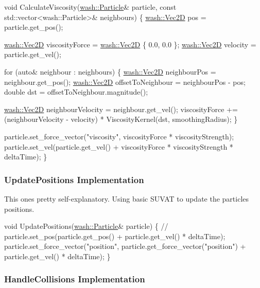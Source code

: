 \begin{DoxyCode}
\textcolor{keywordtype}{void} CalculateViscosity(\mbox{\hyperlink{classwash_1_1Particle}{wash::Particle}}& particle, \textcolor{keyword}{const} std::vector<wash::Particle>& 
      neighbours) \{
    \mbox{\hyperlink{classwash_1_1Vec}{wash::Vec2D}} pos = particle.get\_pos();

    \mbox{\hyperlink{classwash_1_1Vec}{wash::Vec2D}} viscosityForce = \mbox{\hyperlink{classwash_1_1Vec}{wash::Vec2D}} \{ 0.0, 0.0 \};
    \mbox{\hyperlink{classwash_1_1Vec}{wash::Vec2D}} velocity = particle.get\_vel();

    \textcolor{keywordflow}{for} (\textcolor{keyword}{auto}& neighbour : neighbours) \{
        \mbox{\hyperlink{classwash_1_1Vec}{wash::Vec2D}} neighbourPos = neighbour.get\_pos();
        \mbox{\hyperlink{classwash_1_1Vec}{wash::Vec2D}} offsetToNeighbour = neighbourPos - pos;
        \textcolor{keywordtype}{double} dst = offsetToNeighbour.magnitude();

        \mbox{\hyperlink{classwash_1_1Vec}{wash::Vec2D}} neighbourVelocity = neighbour.get\_vel();
        viscosityForce += (neighbourVelocity - velocity) * ViscosityKernel(dst, smoothingRadius);
    \}

    particle.set\_force\_vector(\textcolor{stringliteral}{"viscosity"}, viscosityForce * viscosityStrength);
    particle.set\_vel(particle.get\_vel() + viscosityForce * viscosityStrength * deltaTime);
\}
\end{DoxyCode}


\subsubsection*{Update\+Positions Implementation}

This one\textquotesingle{}s pretty self-\/explanatory. Using basic S\+U\+V\+AT to update the particles\textquotesingle{} positions. 
\begin{DoxyCode}
\textcolor{keywordtype}{void} UpdatePositions(\mbox{\hyperlink{classwash_1_1Particle}{wash::Particle}}& particle) \{
    \textcolor{comment}{// particle.set\_pos(particle.get\_pos() + particle.get\_vel() * deltaTime);}
    particle.set\_force\_vector(\textcolor{stringliteral}{"position"}, particle.get\_force\_vector(\textcolor{stringliteral}{"position"}) + particle.get\_vel() * 
      deltaTime);
\}
\end{DoxyCode}


\subsubsection*{Handle\+Collisions Implementation}

